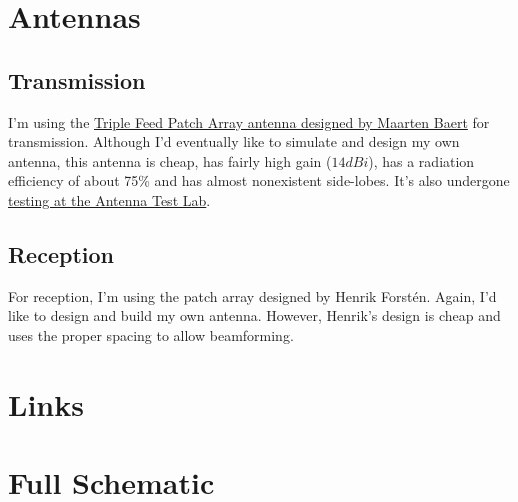 \documentclass{default}
\newcounter{includepdfpage}
\begin{document}
\chapter{Antennas}
\label{cha:antennas}

\section{Transmission}
\label{sec:antenna-transmission}

I'm using the
\href{https://www.maartenbaert.be/quadcopters/antennas/triple-feed-patch-array-antenna/}{Triple Feed
  Patch Array antenna designed by Maarten Baert} for transmission. Although I'd eventually like to
simulate and design my own antenna, this antenna is cheap, has fairly high gain ($14 \si{dBi}$), has
a radiation efficiency of about 75\% and has almost nonexistent side-lobes. It's also undergone
\href{https://antennatestlab.com/antenna-examples/example-8-triple-feed-patch-array-circularly-polarized-antenna}{testing
  at the Antenna Test Lab}.

\section{Reception}
\label{sec:antenna-reception}

For reception, I'm using the patch array designed by Henrik Forst\'en. Again, I'd like to design and
build my own antenna. However, Henrik's design is cheap and uses the proper spacing to allow
beamforming.

\begin{appendices}

        

        \chapter{Links}
        \label{cha:links}


        \chapter{Full Schematic}
        \label{cha:schematic}

        

\end{appendices}
\end{document}
